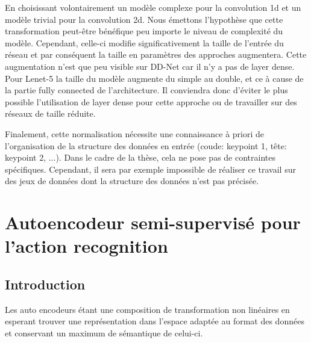 En choisissant volontairement un modèle complexe pour la convolution 1d et un modèle trivial pour la convolution 2d. Nous émettons l'hypothèse que cette transformation peut-être bénéfique peu importe le niveau de complexité du modèle. Cependant, celle-ci modifie significativement la taille de l'entrée du réseau et par conséquent la taille en paramètres des approches augmentera. Cette augmentation n'est que peu visible sur DD-Net car il n'y a pas de layer dense. Pour Lenet-5 la taille du modèle augmente du simple au double, et ce à cause de la partie fully connected de l'architecture. Il conviendra donc d'éviter le plus possible l'utilisation de layer dense pour cette approche ou de travailler sur des réseaux de taille réduite.

Finalement, cette normalisation nécessite une connaissance à priori de l'organisation de la structure des données en entrée (coude: keypoint 1, tête: keypoint 2, ...). Dans le cadre de la thèse, cela ne pose pas de contraintes spécifiques. Cependant, il sera par exemple impossible de réaliser ce travail sur des jeux de données dont la structure des données n'est pas précisée.

\section{Autoencodeur semi-supervisé pour l'action recognition}

\subsection{Introduction}
Les auto encodeurs étant une composition de transformation non linéaires en esperant trouver une représentation dans l'espace adaptée au format des données et conservant un maximum de sémantique de celui-ci.

